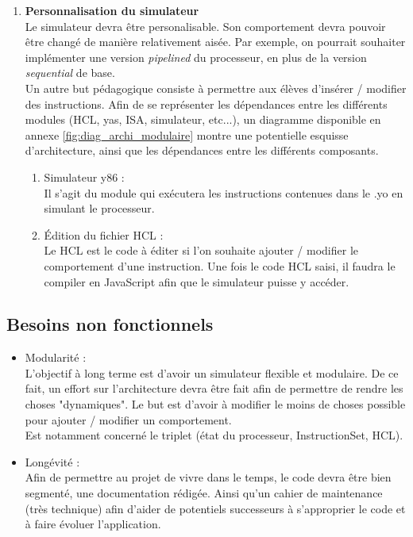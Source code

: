 \documentclass[french]{article}
\begin{document}
\begin{enumerate}
        
    \item \textbf{Personnalisation du simulateur} \\
    Le simulateur devra être personalisable. Son comportement devra pouvoir être changé de manière relativement aisée. Par exemple, on pourrait souhaiter implémenter une version \textit{pipelined} du processeur, en plus de la version \textit{sequential} de base.\\
    Un autre but pédagogique consiste à permettre aux élèves d'insérer / modifier des instructions. 
    Afin de se représenter les dépendances entre les différents modules (HCL, yas, ISA, simulateur, etc...), un diagramme disponible en annexe \ref{fig:diag_archi_modulaire} montre une potentielle esquisse d'architecture, ainsi que les dépendances entre les différents composants.
    
    \begin{enumerate}
        \item Simulateur y86 : \\
        Il s'agit du module qui exécutera les instructions contenues dans le .yo en simulant le processeur.
        \item Édition du fichier HCL : \\
        Le HCL est le code à éditer si l'on souhaite ajouter / modifier le comportement d'une instruction. Une fois le code HCL saisi, il faudra le compiler en JavaScript afin que le simulateur puisse y accéder.
    \end{enumerate}
\end{enumerate}


\subsection{Besoins non fonctionnels}
\begin{itemize}
    \item Modularité :\\
    L’objectif à long terme est d’avoir un simulateur flexible et modulaire. De ce fait, un effort sur l’architecture devra être fait afin de permettre de rendre les choses "dynamiques". Le but est d’avoir à modifier le moins de choses possible pour ajouter / modifier un comportement.\\
    Est notamment concerné le triplet (état du processeur, InstructionSet, HCL).
    
    \item Longévité :\\
    Afin de permettre au projet de vivre dans le temps, le code devra être bien segmenté, une documentation rédigée. Ainsi qu’un cahier de maintenance (très technique) afin d’aider de potentiels successeurs à s’approprier le code et à faire évoluer l'application.
\end{itemize}
    
\end{document}
